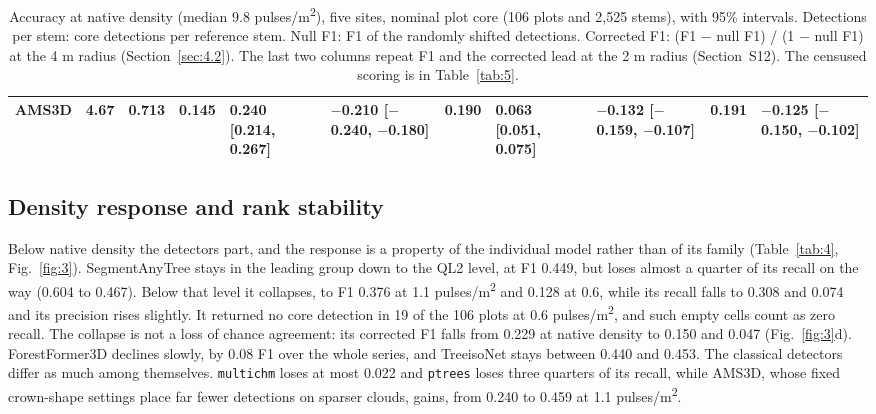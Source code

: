 \documentclass[preprint,12pt,authoryear,a4paper]{elsarticle}
\begin{document}
\begin{table}
{\begin{tabularx}{\linewidth}{LLllLLlLLlL}
AMS3D & 4.67 & 0.713 & 0.145 & 0.240 [0.214, 0.267] & $-$0.210 [$-$0.240, $-$0.180] & 0.190 & 0.063 [0.051, 0.075] & $-$0.132 [$-$0.159, $-$0.107] & 0.191 & $-$0.125 [$-$0.150, $-$0.102] \\
\bottomrule
\end{tabularx}
}
\caption{Accuracy at native density (median 9.8 pulses/m\textsuperscript{2}), five sites,
nominal plot core (106 plots and 2,525 stems), with 95\% intervals. Detections
per stem: core detections per reference stem. Null F1: F1 of the randomly
shifted detections. Corrected F1: (F1 $-$ null F1) / (1 $-$ null F1) at the 4 m
radius (Section~\ref{sec:4.2}). The last two columns repeat F1 and the corrected lead at
the 2 m radius (Section~S12). The censused scoring is in Table~\ref{tab:5}.}
\label{tab:3}
\end{table}

\subsection{Density response and rank stability}\label{sec:5.2}

Below native density the detectors part, and the response is a property of the
individual model rather than of its family (Table~\ref{tab:4}, Fig.~\ref{fig:3}). SegmentAnyTree
stays in the leading group down to the QL2 level, at F1 0.449, but loses almost
a quarter of its recall on the way (0.604 to 0.467). Below that level it
collapses, to F1 0.376 at 1.1 pulses/m\textsuperscript{2} and 0.128 at 0.6, while its recall falls
to 0.308 and 0.074 and its precision rises slightly. It returned no core
detection in 19 of the 106 plots at 0.6 pulses/m\textsuperscript{2}, and such empty cells count as
zero recall. The collapse is not a loss of chance agreement: its corrected F1
falls from 0.229 at native density to 0.150 and 0.047 (Fig.~\ref{fig:3}d). ForestFormer3D
declines slowly, by 0.08 F1 over the whole series, and TreeisoNet stays between
0.440 and 0.453. The classical detectors differ as much among themselves.
\texttt{multichm} loses at most 0.022 and \texttt{ptrees} loses three quarters of its recall,
while AMS3D, whose fixed crown-shape settings place far fewer detections on
sparser clouds, gains, from 0.240 to 0.459 at 1.1 pulses/m\textsuperscript{2}.
\end{document}
